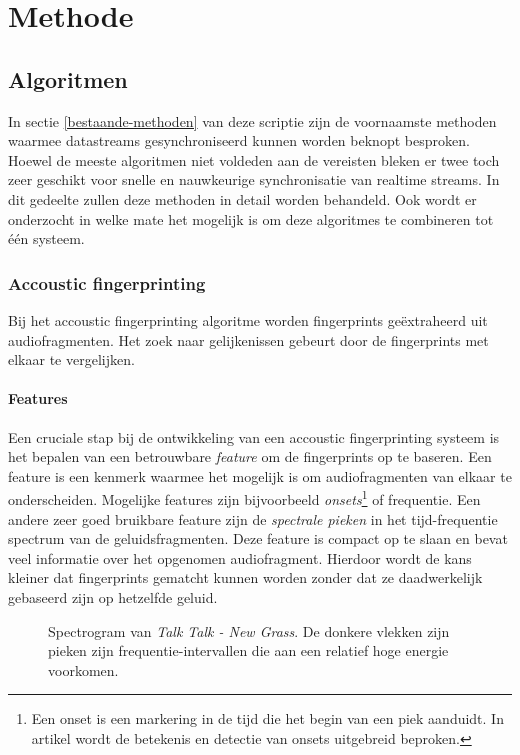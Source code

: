 \chapter{Methode}

\section{Algoritmen}

In sectie \ref{bestaande-methoden} van deze scriptie zijn de voornaamste methoden waarmee datastreams gesynchroniseerd kunnen worden beknopt besproken. Hoewel de meeste algoritmen niet voldeden aan de vereisten bleken er twee toch zeer geschikt voor snelle en nauwkeurige synchronisatie van realtime streams. In dit gedeelte zullen deze methoden in detail worden behandeld. Ook wordt er onderzocht in welke mate het mogelijk is om deze algoritmes te combineren tot één systeem.

\subsection{Accoustic fingerprinting}
\label{accoustic-fingerprinting}

Bij het accoustic fingerprinting algoritme worden fingerprints geëxtraheerd uit audiofragmenten. Het zoek naar gelijkenissen gebeurt door de fingerprints met elkaar te vergelijken. 

\subsubsection{Features}

Een cruciale stap bij de ontwikkeling van een accoustic fingerprinting systeem is het bepalen van een betrouwbare \textit{feature} om de fingerprints op te baseren. Een feature is een kenmerk waarmee het mogelijk is om audiofragmenten van elkaar te onderscheiden. Mogelijke features zijn bijvoorbeeld \textit{onsets}\footnote{Een onset is een markering in de tijd die het begin van een piek aanduidt. In artikel \cite{bello2005tutorial} wordt de betekenis en detectie van onsets uitgebreid beproken.} of frequentie. Een andere zeer goed bruikbare feature zijn de \textit{spectrale pieken} in het tijd-frequentie spectrum van de geluidsfragmenten. Deze feature is compact op te slaan en bevat veel informatie over het opgenomen audiofragment. Hierdoor wordt de kans kleiner dat fingerprints gematcht kunnen worden zonder dat ze daadwerkelijk gebaseerd zijn op hetzelfde geluid.

\begin{figure}[h!]
	\captionsetup{width=0.7\textwidth}
	\caption[Voorbeeld van een spectrogram]{Spectrogram van \textit{Talk Talk - New Grass}. De donkere vlekken zijn pieken zijn frequentie-intervallen die aan een relatief hoge energie voorkomen.}
	\begin{center}
		\advance\parskip0.3cm
		
	\end{center}
	\label{spectrogram}
\end{figure}

